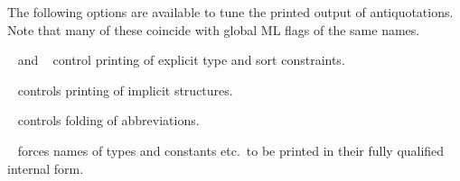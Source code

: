 \begin{isabellebody}
\begin{isamarkuptext}
\begin{description}
  \end{description}%
\end{isamarkuptext}%
\isamarkuptrue%
%
\isamarkuptrue%
%
\begin{isamarkuptext}%
The following options are available to tune the printed output
  of antiquotations.  Note that many of these coincide with global ML
  flags of the same names.

  \begin{description}

  \item {}\hypertarget{antiquotation option.show-types}{\hyperlink{antiquotation option.show-types}{\mbox{}}}~ and
  \hypertarget{antiquotation option.show-sorts}{\hyperlink{antiquotation option.show-sorts}{\mbox{}}}~ control
  printing of explicit type and sort constraints.

  \item {}\hypertarget{antiquotation option.show-structs}{\hyperlink{antiquotation option.show-structs}{\mbox{}}}~
  controls printing of implicit structures.

  \item {}\hypertarget{antiquotation option.show-abbrevs}{\hyperlink{antiquotation option.show-abbrevs}{\mbox{}}}~
  controls folding of abbreviations.

  \item {}\hypertarget{antiquotation option.long-names}{\hyperlink{antiquotation option.long-names}{\mbox{}}}~ forces
  names of types and constants etc.\ to be printed in their fully
  qualified internal form.


\end{description}
\end{isamarkuptext}
\end{isabellebody}
